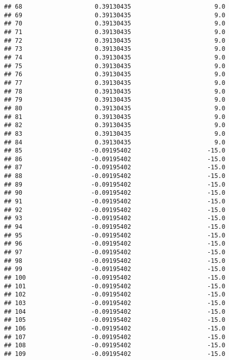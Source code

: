 \documentclass[]{article}
\begin{document}
\begin{verbatim}
## 68                    0.39130435                       9.0
## 69                    0.39130435                       9.0
## 70                    0.39130435                       9.0
## 71                    0.39130435                       9.0
## 72                    0.39130435                       9.0
## 73                    0.39130435                       9.0
## 74                    0.39130435                       9.0
## 75                    0.39130435                       9.0
## 76                    0.39130435                       9.0
## 77                    0.39130435                       9.0
## 78                    0.39130435                       9.0
## 79                    0.39130435                       9.0
## 80                    0.39130435                       9.0
## 81                    0.39130435                       9.0
## 82                    0.39130435                       9.0
## 83                    0.39130435                       9.0
## 84                    0.39130435                       9.0
## 85                   -0.09195402                     -15.0
## 86                   -0.09195402                     -15.0
## 87                   -0.09195402                     -15.0
## 88                   -0.09195402                     -15.0
## 89                   -0.09195402                     -15.0
## 90                   -0.09195402                     -15.0
## 91                   -0.09195402                     -15.0
## 92                   -0.09195402                     -15.0
## 93                   -0.09195402                     -15.0
## 94                   -0.09195402                     -15.0
## 95                   -0.09195402                     -15.0
## 96                   -0.09195402                     -15.0
## 97                   -0.09195402                     -15.0
## 98                   -0.09195402                     -15.0
## 99                   -0.09195402                     -15.0
## 100                  -0.09195402                     -15.0
## 101                  -0.09195402                     -15.0
## 102                  -0.09195402                     -15.0
## 103                  -0.09195402                     -15.0
## 104                  -0.09195402                     -15.0
## 105                  -0.09195402                     -15.0
## 106                  -0.09195402                     -15.0
## 107                  -0.09195402                     -15.0
## 108                  -0.09195402                     -15.0
## 109                  -0.09195402                     -15.0

\end{verbatim}
\end{document}
